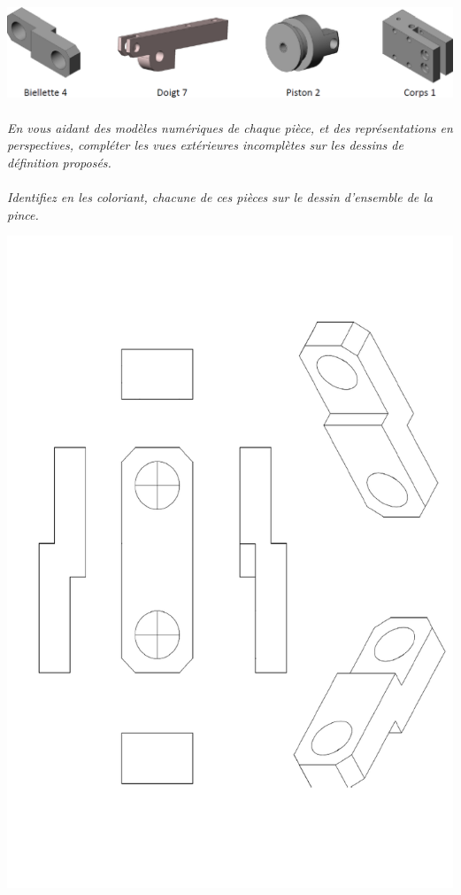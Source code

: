 \documentclass[11pt,oneside]{article}
\begin{document}
\begin{center}
\includegraphics[width=.9\textwidth]{png/fig7}
\end{center}


\paragraph{}
\textit{En vous aidant des modèles numériques de chaque pièce, et des représentations en perspectives, compléter les vues extérieures incomplètes sur les dessins de définition proposés.}

\paragraph{}
\textit{Identifiez en les coloriant, chacune de ces pièces sur le dessin d’ensemble de la pince.}


\begin{center}
\includegraphics[height=\textheight]{png/fig8}
\end{center}
\end{document}
